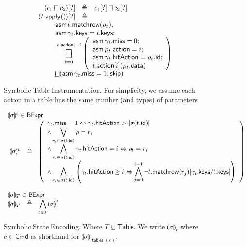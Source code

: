 \documentclass{article}
\newcommand{\BExpr}{\mathsf{BExpr}}
\newcommand{\Cmd}{\mathsf{Cmd}}
\newcommand{\Table}{\mathsf{Table}}
\newcommand{\action}{\mathsf{action}}
\newcommand{\keys}{\mathsf{keys}}
\newcommand{\data}{\mathsf{data}}
\newcommand{\id}{\mathsf{id}}
\newcommand{\hitAction}{\mathsf{hitAction}}
\newcommand{\miss}{\mathsf{miss}}
\newcommand{\assume}{\mathop{\mathsf{asm}}}
\newcommand{\apply}{\mathsf{apply}}
\newcommand{\choiceop}{\rotatebox[origin=c]{90}{$\sqsubset\!\!\!\sqsupset$}}
\newcommand{\choice}{\mathbin{\choiceop}}
\DeclareMathOperator*{\bigchoice}{\scalerel*{\choiceop}{\sum}}
\newcommand{\SKIP}{\mathsf{skip}}
\newcommand{\state}[1]{\llparenthesis#1\rrparenthesis}
\newcommand{\instr}{[?]}
\newcommand{\matchrow}{\mathsf{matchrow}}
\newcommand{\tables}{\mathop{\mathsf{tables}}}
\theoremstyle{plain}
\theoremstyle{definition}
\theoremstyle{remark}
\begin{document}
\begin{figure}[htp]
\[\begin{array}{r >{\triangleq}cl}
  (c_1 \choice c_2)\instr && c_1\instr \choice c_2\instr\\
  (t.\apply())\instr &&\\
  \multicolumn{3}{l}{
    \qquad
    \begin{array}[t]{l} \displaystyle
      \assume t.\matchrow(\rho_t); \\
      \assume \gamma_t.\keys = t.\keys; \\
    \displaystyle \bigchoice_{i=0}^{|t.\action| -1}
    \left(\begin{array}{l}
      \assume \gamma_t.\miss = 0;\\
      \assume \rho_t.\action = i;\\
      \assume \gamma_t.\hitAction = \rho_t.\id;\\
      t.\action[i](\rho_t.\data)
    \end{array}\right)\\
    \choice (\assume \gamma_t.\miss = 1; \SKIP)  \\
  \end{array}}
  \end{array}
  \]
  \caption{Symbolic Table Instrumentation. For simplicity, we
    assume each action in a table has the same number (and types) of parameters}
  \label{fig:table-instrument}
\end{figure}

\begin{figure}[htp]
  \[\begin{array}{r cl}
  \multicolumn{3}{l}{\state\sigma^t \in \BExpr} \\
  \state\sigma^t & \triangleq &
  \left(\begin{array}{>{\displaystyle}l}
  \gamma_t.\miss = 1 \Leftrightarrow \gamma_t.\hitAction > |\sigma(t.\id)| \\
  \wedge \bigvee_{r_i \in \sigma(t.\id)} \rho = r_i  \\
  \wedge \bigwedge_{r_i \in \sigma(t.\id)} \gamma_t.\hitAction = i \Leftrightarrow \rho_t = r_i \\
  \wedge \bigwedge_{r_i \in \sigma(t.\id)} \left(\gamma_t.\hitAction \geq i \Leftrightarrow \bigwedge_{j=0}^{i-1} \neg t.\matchrow(r_j)[\gamma_t.\keys/t.\keys]\right)\\
  \end{array}\right)\\\\

  \multicolumn{3}{l}{\state\sigma_T \in \BExpr} \\
  \state\sigma_T &\triangleq
  & \displaystyle\bigwedge_{ t \in T } \state\sigma^t
  \end{array}
  \]
  \caption{Symbolic State Encoding. Where $T \subseteq \Table$. We write
    $\state\sigma_c$ where $c \in \Cmd$ as shorthand for $\state\sigma_{\tables(c)}$.}
  \label{fig:table-instrument}
\end{figure}
\end{document}
